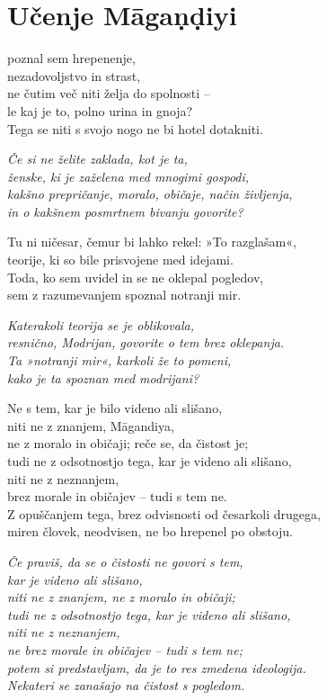 \cleartorecto
{}
\chapter{Učenje Māgaṇḍiyi}

poznal sem hrepenenje,\\
nezadovoljstvo in strast,\\
ne čutim več niti želja do spolnosti --\\
le kaj je to, polno urina in gnoja?\\
Tega se niti s svojo nogo ne bi hotel dotakniti.

\emph{Če si ne želite zaklada, kot je ta,\\
ženske, ki je zaželena med mnogimi gospodi,\\
kakšno prepričanje, moralo, običaje, način življenja,\\
in o kakšnem posmrtnem bivanju govorite?}

Tu ni ničesar, čemur bi lahko rekel: »To razglašam«,\\
teorije, ki so bile prisvojene med idejami.\\
Toda, ko sem uvidel in se ne oklepal pogledov,\\
sem z razumevanjem spoznal notranji mir.

\clearpage

\emph{Katerakoli teorija se je oblikovala,\\
resnično, Modrijan, govorite o tem brez oklepanja.\\
Ta »notranji mir«, karkoli že to pomeni,\\
kako je ta spoznan med modrijani?}

Ne s tem, kar je bilo videno ali slišano,\\\vin niti ne z znanjem, Māgandiya,\\
ne z moralo in običaji; reče se, da čistost je;\\
tudi ne z odsotnostjo tega, kar je videno ali slišano,\\\vin niti ne z neznanjem,\\
brez morale in običajev -- tudi s tem ne.\\
Z opuščanjem tega, brez odvisnosti od česarkoli drugega,\\
miren človek, neodvisen, ne bo hrepenel po obstoju.

\emph{Če praviš, da se o čistosti ne govori s tem,\\\vin kar je videno ali slišano,\\
niti ne z znanjem, ne z moralo in običaji;\\
tudi ne z odsotnostjo tega, kar je videno ali slišano,\\\vin niti ne z neznanjem,\\
ne brez morale in običajev -- tudi s tem ne;\\
potem si predstavljam, da je to res zmedena ideologija.\\
Nekateri se zanašajo na čistost s pogledom.}

